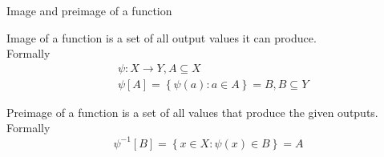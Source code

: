 \documentclass{beamer}
\begin{document}
\begin{frame}{Image and preimage of a function}
    \begin{definition}
        Image of a function is a set of all output values it can produce. \\
        Formally
        \begin{eqnarray*}
            & \psi : X \to Y, A \subseteq X \\
            & \psi[A] = \left\{\psi(a) : a \in A \right\} = B, B \subseteq Y
        \end{eqnarray*}
    \end{definition}
    \begin{definition}
        Preimage of a function is a set of all values that produce the given 
        outputs. Formally
        \begin{equation*}
            \psi^{-1}[B] = \left\{x \in X : \psi(x) \in B \right\} = A
        \end{equation*}
    \end{definition}
\end{frame}
\end{document}
